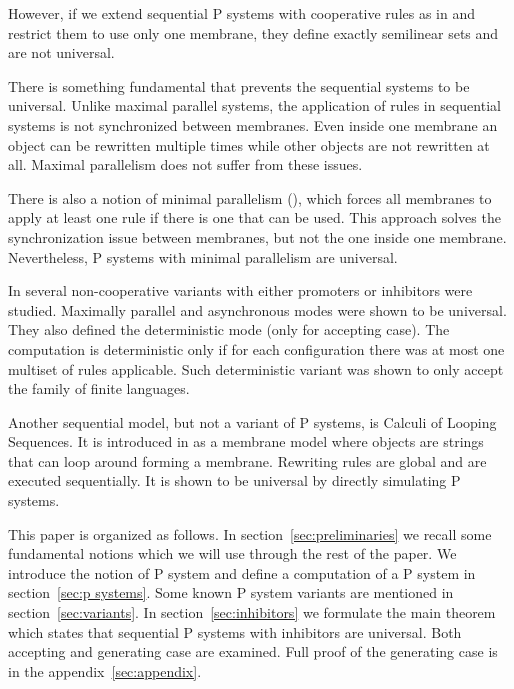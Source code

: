 \documentclass[llncs,submission,copyright,creativecommons]{../lib/lncs/llncs}
\begin{document}

However, if we extend sequential P systems with cooperative rules as in \cite{Dang04onp} and restrict them to use only one membrane, they define exactly semilinear sets and are not universal.

There is something fundamental that prevents the sequential systems to be universal. Unlike maximal parallel systems, the application of rules in sequential systems is not synchronized between membranes. Even inside one membrane an object can be rewritten multiple times while other objects are not rewritten at all.
Maximal parallelism does not suffer from these issues.

There is also a notion of minimal parallelism (\cite{Ciobanu:2007:PSM:1243519.1243811}), which forces all membranes to apply at least one rule if there is one that can be used. This approach solves the synchronization issue between membranes, but not the one inside one membrane. Nevertheless, P systems with minimal parallelism are universal.




In \cite{Alhazov13} several non-cooperative variants with either promoters or inhibitors were studied. Maximally parallel and asynchronous modes were shown to be universal. They also defined the deterministic mode (only for accepting case). The computation is deterministic only if for each configuration there was at most one multiset of rules applicable. Such deterministic variant was shown to only accept the family of finite languages.


Another sequential model, but not a variant of P systems, is Calculi of Looping Sequences. It is introduced in \cite{Barbuti07thecalculus} as a membrane model where objects are strings that can loop around forming a membrane. Rewriting rules are global and are executed sequentially. It is shown to be universal by directly simulating P systems.


This paper is organized as follows. In section~\ref{sec:preliminaries} we recall some fundamental notions which we will use through the rest of the paper.
We introduce the notion of P system and define a computation of a P system in section~\ref{sec:p systems}.
Some known P system variants are mentioned in section~\ref{sec:variants}.
In section~\ref{sec:inhibitors} we formulate the main theorem which states that sequential P systems with inhibitors are universal. Both accepting and generating case are examined. Full proof of the generating case is in the appendix~\ref{sec:appendix}.
\end{document}
